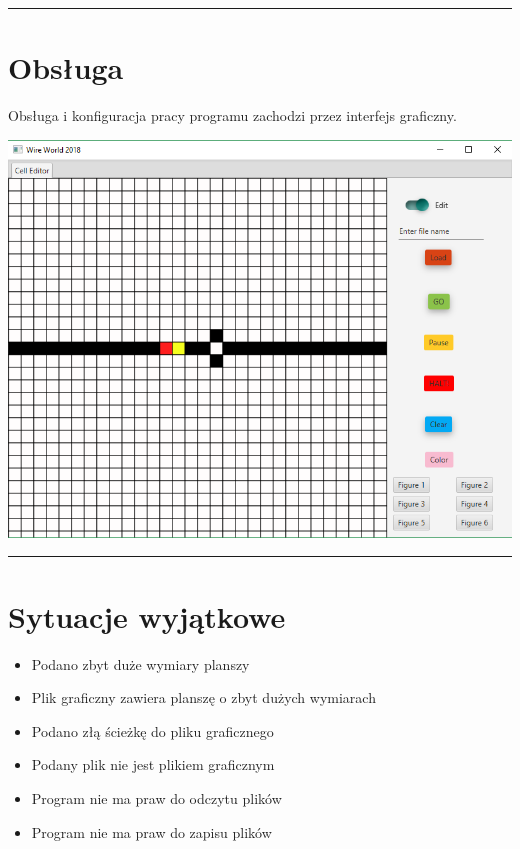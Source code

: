 \documentclass[a4paper,11pt]{article}
\newcommand{\linia}{\rule{\linewidth}{0.4mm}}
\begin{document}
\noindent\linia
\section{Obsługa}
Obsługa i konfiguracja pracy programu zachodzi przez interfejs graficzny.


\includegraphics[width=\textwidth]{GUI_WireWorld}

\noindent\linia
\section{Sytuacje wyjątkowe}
\begin{itemize}
\item Podano zbyt duże wymiary planszy
\item Plik graficzny zawiera planszę o zbyt dużych wymiarach
\item Podano złą ścieżkę do pliku graficznego
\item Podany plik nie jest plikiem graficznym
\item Program nie ma praw do odczytu plików 
\item Program nie ma praw do zapisu plików
\end{itemize}
\end{document}
